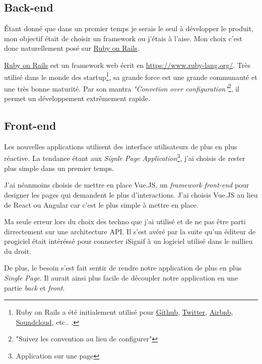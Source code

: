 \documentclass[]{report}
\begin{document}
    \subsection{Back-end}

      Étant donné que dans un premier temps je serais le seul à développer le produit, mon objectif était de choisir un framework ou j'étais à l'aise. Mon choix c'est donc naturellement posé sur \href{https://rubyonrails.org/}{Ruby on Rails}.

      \href{https://rubyonrails.org/}{Ruby on Rails} est un framework web écrit en \href{Ruby}{https://www.ruby-lang.org/}. Très utilisé dans le monde des startup\footnote{ Ruby on Rails a été initialement utilisé pour \href{https://github.com/}{Github}, \href{https://twitter.com/}{Twitter}, \href{https://airbnb.com/}{Airbnb}, \href{https://soundcloud.com/}{Soundcloud}, etc.. .}, sa grande force est une grande communauté et une très bonne maturité. Par son mantra \textit{"Convetion over configuration"}\footnote{"Suivez les convention au lieu de configurer"}, il permet un développement extrêmement rapide.

    \subsection{Front-end}

      Les nouvelles applications utilisent des interface utilisateurs de plus en plus réactive. La tendance étant aux \textit{Signle Page Application}\footnote{Application sur une page}, j'ai choisis de rester plus simple dans un premier temps.

      J'ai néanmoins choisis de mettre en place Vue.JS, un \textit{framework front-end} pour designer les pages qui demandent le plus d’interactions. J'ai choisis Vue.JS au lieu de React ou Angular car c'est le plus simple à mettre en place.


      \begin{tcolorbox}
        Ma seule erreur lors du choix des techno que j'ai utilisé et de ne pas être parti dirrectement sur une architecture API. Il s'est avéré par la suite qu'un éditeur de progiciel était intéréssé pour connecter iSignif à un logiciel utilisé dans le millieu du droit.

        De plus, le besoin s'est fait sentir de rendre notre application de plus en plus \textit{Single Page}. Il aurait ainsi plus facile de découpler notre application en une partie \textit{back} et \textit{front}.
      \end{tcolorbox}
\end{document}
